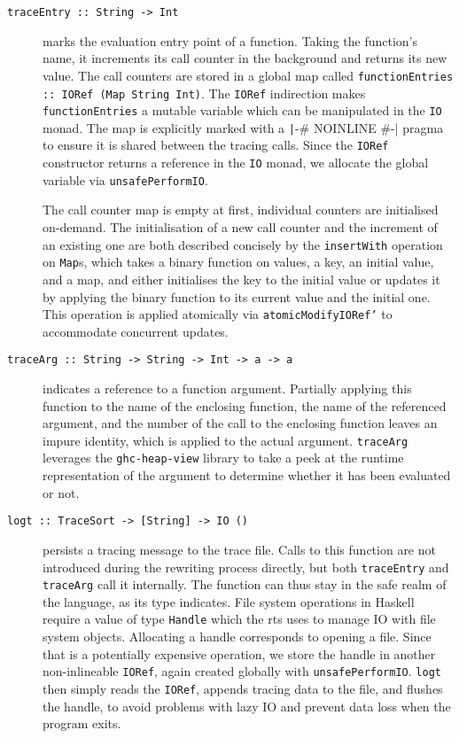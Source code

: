 \documentclass[thesis=B,english]{FITthesis}[2019/12/23]
\newcommand{\hackage}[1]{\texttt{#1}}
\newcommand{\hsType}[1]{\texttt{#1}}
\newcommand{\hsIdent}[1]{\texttt{#1}}
\newcommand{\hsCode}[1]{\texttt{#1}}
\begin{document}
\begin{description}
	\item[\hsCode{traceEntry :: String -> Int}] marks the evaluation entry
		point of a function. Taking the function's name, it increments its call
		counter in the background and returns its new value. The call counters
		are stored in a global map called \hsCode{functionEntries :: IORef (Map
		String Int)}. The \hsType{IORef} indirection makes
		\hsIdent{functionEntries} a mutable variable which can be manipulated
		in the \hsType{IO} monad. The map is explicitly marked with a
		\texttt|{-# NOINLINE #-}|
		pragma to ensure it is shared between the tracing calls. Since the
		\hsType{IORef} constructor returns a reference in the \hsType{IO}
		monad, we allocate the global variable via \hsIdent{unsafePerformIO}.

		The call counter map is empty at first, individual counters are
		initialised on-demand. The initialisation of a new call counter and the
		increment of an existing one are both described concisely by the
		\hsIdent{insertWith} operation on \hsType{Map}s, which takes a binary
		function on values, a key, an initial value, and a map, and either
		initialises the key to the initial value or updates it by applying the
		binary function to its current value and the initial one. This
		operation is applied atomically via \hsIdent{atomicModifyIORef'} to
		accommodate concurrent updates.

	\item[\hsCode{traceArg :: String -> String -> Int -> a -> a}] indicates a
		reference to a function argument. Partially applying this function to
		the name of the enclosing function, the name of the referenced
		argument, and the number of the call to the enclosing function leaves
		an impure identity, which is applied to the actual argument.
		\hsIdent{traceArg} leverages the \hackage{ghc-heap-view} library to
		take a peek at the runtime representation of the argument to determine
		whether it has been evaluated or not.

	\item[\hsCode{logt :: TraceSort -> [String] -> IO ()}] persists a tracing
		message to the trace file. Calls to this function are not introduced
		during the rewriting process directly, but both \hsIdent{traceEntry}
		and \hsIdent{traceArg} call it internally. The function can thus stay
		in the safe realm of the language, as its type indicates. File system
		operations in Haskell require a value of type \hsType{Handle} which the
		\acrshort{rts} uses to manage IO with file system objects. Allocating a
		handle corresponds to opening a file. Since that is a potentially
		expensive operation, we store the handle in another non-in\-line\-able
		\hsType{IORef}, again created globally with \hsIdent{unsafePerformIO}.
		\hsIdent{logt} then simply reads the \hsType{IORef}, appends tracing
		data to the file, and flushes the handle, to avoid problems with lazy
		IO and prevent data loss when the program exits.

\end{description}
\end{document}
